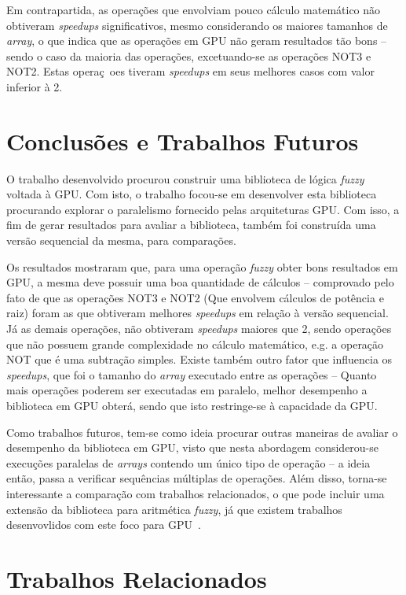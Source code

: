 \documentclass[12pt]{article}
\begin{document}
Em contrapartida, as operações que envolviam pouco cálculo matemático não obtiveram \textit{speedups} significativos, mesmo considerando os maiores tamanhos de \textit{array}, o que indica que as operações em GPU não geram resultados tão bons -- sendo o caso da maioria das operações, excetuando-se as operações NOT3 e NOT2. Estas operaç~oes tiveram \textit{speedups} em seus melhores casos com valor inferior à 2.

\section{Conclusões e Trabalhos Futuros}
\label{sec:conclusoes}

	O trabalho desenvolvido procurou construir uma	biblioteca de lógica \textit{fuzzy} voltada à GPU. Com isto, o trabalho focou-se em desenvolver esta biblioteca procurando explorar o paralelismo fornecido pelas arquiteturas GPU. Com isso, a fim de gerar resultados para avaliar a biblioteca, também foi construída uma versão sequencial da mesma, para comparações.
	
	Os resultados mostraram que, para uma operação \textit{fuzzy} obter bons resultados em GPU, a mesma deve possuir uma boa quantidade de cálculos -- comprovado pelo fato de que as operações NOT3 e NOT2 (Que envolvem cálculos de potência e raiz) foram as que obtiveram melhores \textit{speedups} em relação à versão sequencial. Já as demais operações, não obtiveram \textit{speedups} maiores que 2, sendo operações que não possuem grande complexidade no cálculo matemático, e.g. a operação NOT que é uma subtração simples. Existe também outro fator que influencia os \textit{speedups}, que foi o tamanho do \textit{array} executado entre as operações -- Quanto mais operações poderem ser executadas em paralelo, melhor desempenho a biblioteca em GPU obterá, sendo que isto restringe-se à capacidade da GPU.
	
	Como trabalhos futuros, tem-se como ideia procurar outras maneiras de avaliar o desempenho da biblioteca em GPU, visto que nesta abordagem considerou-se execuções paralelas de \textit{arrays} contendo um único tipo de operação -- a ideia então, passa a verificar sequências múltiplas de operações. Além disso, torna-se interessante a comparação com trabalhos relacionados, o que pode incluir uma extensão da biblioteca para aritmética \textit{fuzzy}, já que existem trabalhos desenvovlidos com este foco para GPU~\cite{defour:14}.
	
\section{Trabalhos Relacionados}
\label{sec:trabalhos}
\end{document}
